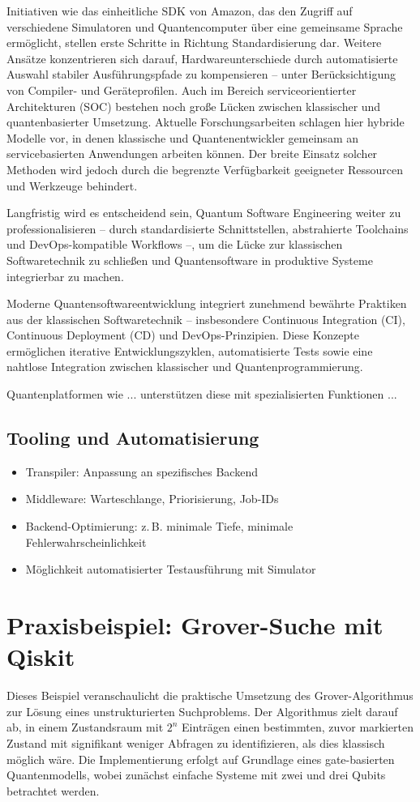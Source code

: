 Initiativen wie das einheitliche SDK von Amazon, das den Zugriff auf verschiedene Simulatoren und Quantencomputer über eine gemeinsame Sprache ermöglicht, stellen erste Schritte in Richtung Standardisierung dar. Weitere Ansätze konzentrieren sich darauf, Hardwareunterschiede durch automatisierte Auswahl stabiler Ausführungspfade zu kompensieren – unter Berücksichtigung von Compiler- und Geräteprofilen. Auch im Bereich serviceorientierter Architekturen (SOC) bestehen noch große Lücken zwischen klassischer und quantenbasierter Umsetzung. Aktuelle Forschungsarbeiten schlagen hier hybride Modelle vor, in denen klassische und Quantenentwickler gemeinsam an servicebasierten Anwendungen arbeiten können. Der breite Einsatz solcher Methoden wird jedoch durch die begrenzte Verfügbarkeit geeigneter Ressourcen und Werkzeuge behindert.

Langfristig wird es entscheidend sein, Quantum Software Engineering weiter zu professionalisieren – durch standardisierte Schnittstellen, abstrahierte Toolchains und DevOps-kompatible Workflows –, um die Lücke zur klassischen Softwaretechnik zu schließen und Quantensoftware in produktive Systeme integrierbar zu machen.



Moderne Quantensoftwareentwicklung integriert zunehmend bewährte Praktiken aus der klassischen Softwaretechnik – insbesondere Continuous Integration (CI), Continuous Deployment (CD) und DevOps-Prinzipien. Diese Konzepte ermöglichen iterative Entwicklungszyklen, automatisierte Tests sowie eine nahtlose Integration zwischen klassischer und Quantenprogrammierung.

Quantenplatformen wie ... unterstützen diese mit spezialisierten Funktionen ...

\subsection{Tooling und Automatisierung}
\begin{itemize}
    \item Transpiler: Anpassung an spezifisches Backend
    \item Middleware: Warteschlange, Priorisierung, Job-IDs
    \item Backend-Optimierung: z.\,B. minimale Tiefe, minimale Fehlerwahrscheinlichkeit
    \item Möglichkeit automatisierter Testausführung mit Simulator
\end{itemize}

\section{Praxisbeispiel: Grover-Suche mit Qiskit} 
Dieses Beispiel veranschaulicht die praktische Umsetzung des Grover-Algorithmus zur Lösung eines unstrukturierten Suchproblems. Der Algorithmus zielt darauf ab, in einem Zustandsraum mit $2^n$ Einträgen einen bestimmten, zuvor markierten Zustand mit signifikant weniger Abfragen zu identifizieren, als dies klassisch möglich wäre. Die Implementierung erfolgt auf Grundlage eines gate-basierten Quantenmodells, wobei zunächst einfache Systeme mit zwei und drei Qubits betrachtet werden.


